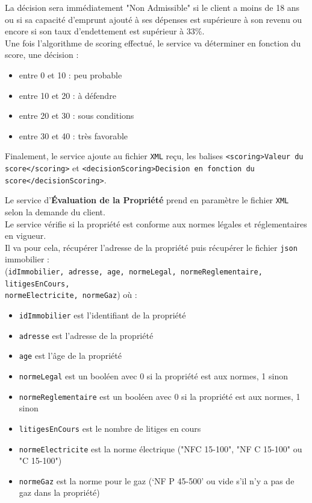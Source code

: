 \documentclass{article}
\begin{document}
	La décision sera immédiatement "Non Admissible" si le client a moins de 18 ans ou si sa capacité d’emprunt ajouté à ses dépenses est supérieure à son revenu ou encore si son taux d’endettement est supérieur à 33\%.\\
	Une fois l’algorithme de scoring effectué, le service va déterminer en fonction du score, une décision : 
	\begin{itemize}
		\item entre 0 et 10 : peu probable
		\item entre 10 et 20 : à défendre
		\item entre 20 et 30 : sous conditions
		\item  entre 30 et 40 : très favorable
	\end{itemize}
	Finalement, le service ajoute au fichier \texttt{XML} reçu, les balises \texttt{<scoring>Valeur du score</scoring>} et \texttt{<decisionScoring>Decision en fonction du score</decisionScoring>}.\\
	
	\newpage
	
	Le service  d'\textbf{Évaluation de la Propriété} prend en paramètre le fichier \texttt{XML} selon la demande du client. \\
	Le service vérifie si la propriété est conforme aux normes légales et réglementaires en vigueur. \\
	Il va pour cela, récupérer l’adresse de la propriété puis récupérer le fichier \texttt{json} immobilier : \\
	(\texttt{idImmobilier, adresse, age, normeLegal, normeReglementaire, litigesEnCours,\\ normeElectricite, normeGaz}) où : 
	\begin{itemize}
		\item \texttt{idImmobilier} est l’identifiant de la propriété
		\item \texttt{adresse} est l’adresse de la propriété
		\item \texttt{age} est l’âge de la propriété
		\item \texttt{normeLegal} est un booléen avec 0 si la propriété est aux normes, 1 sinon
		\item \texttt{normeReglementaire} est un booléen avec 0 si la propriété est aux normes, 1 sinon 
		\item \texttt{litigesEnCours} est le nombre de litiges en cours
		\item \texttt{normeElectricite} est la norme électrique ("NFC 15-100", "NF C 15-100" ou "C 15-100")
		\item \texttt{normeGaz} est la norme pour le gaz (‘NF P 45-500’ ou vide s’il n’y a pas de gaz dans la propriété)
	\end{itemize} 
	
\end{document}

